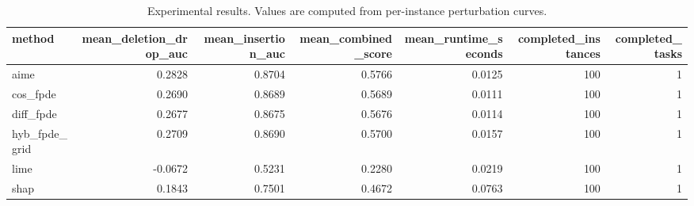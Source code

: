 \begin{table}[t]
\caption{Experimental results. Values are computed from per-instance perturbation curves.}
\label{tab:main_results_computed}
\centering
\begin{tabular}{lrrrrrr}
\toprule
method & mean\_deletion\_drop\_auc & mean\_insertion\_auc & mean\_combined\_score & mean\_runtime\_seconds & completed\_instances & completed\_tasks \\
\midrule
aime & 0.2828 & 0.8704 & 0.5766 & 0.0125 & 100 & 1 \\
cos\_fpde & 0.2690 & 0.8689 & 0.5689 & 0.0111 & 100 & 1 \\
diff\_fpde & 0.2677 & 0.8675 & 0.5676 & 0.0114 & 100 & 1 \\
hyb\_fpde\_grid & 0.2709 & 0.8690 & 0.5700 & 0.0157 & 100 & 1 \\
lime & -0.0672 & 0.5231 & 0.2280 & 0.0219 & 100 & 1 \\
shap & 0.1843 & 0.7501 & 0.4672 & 0.0763 & 100 & 1 \\
\bottomrule
\end{tabular}

\end{table}
